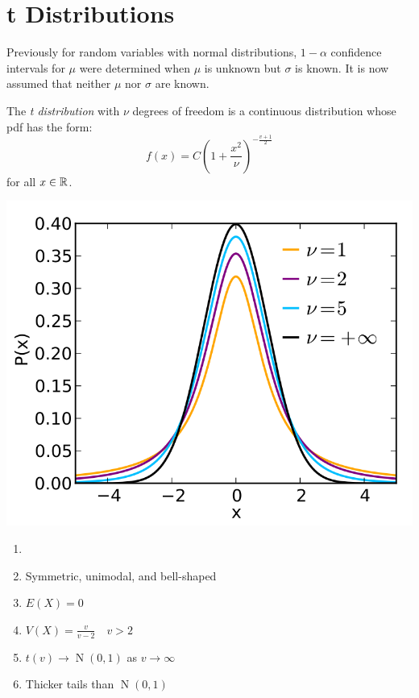 \documentclass[letterpaper,12pt,fleqn]{article}
\renewcommand{\a}{\alpha}
\newcommand{\m}{\mu}
\renewcommand{\o}{\sigma}
\renewcommand{\v}{\nu}
\DeclareMathOperator{\nd}{N}
\begin{document}
\section*{t Distributions}

Previously for random variables with normal distributions, \(1-\a\) confidence intervals for \(\m\) were determined when \(\m\)
is unknown but \(\o\) is known.  It is now assumed that neither \(\m\) nor \(\o\) are known.

\begin{definition}[t Distribution]
  The \emph{t distribution} with \(\v\) degrees of freedom is a continuous distribution whose pdf has the form:
  \[f(x)=C\left(1+\frac{x^2}{\v}\right)^{-\frac{v+1}{2}}\]
  for all \(x\in\mathbb{R}\).
\end{definition}

\begin{properties}[t Distributions]
  \begin{minipage}[t]{3in}
    \vspace{0pt}
    \includegraphics[scale=0.25]{tdist.png}
  \end{minipage}
  \begin{minipage}[t]{3.5in}
    \begin{enumerate}
    \setlength{\itemsep}{5pt}
    \item[]
    \item Symmetric, unimodal, and bell-shaped
    \item \(E(X)=0\)
    \item \(V(X)=\frac{v}{v-2}\quad v>2\)
    \item \(t(v)\to\nd(0,1)\) as \(v\to\infty\)
    \item Thicker tails than \(\nd(0,1)\)
    \end{enumerate}
  \end{minipage}
\end{properties}
\end{document}
